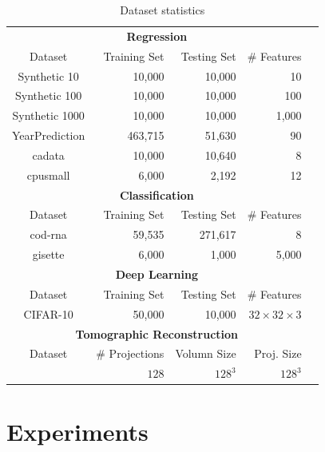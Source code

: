 \documentclass{article}
\begin{document}
\begin{table}[t]
\small
\centering
\begin{tabular}{crrrr}
\hline
\multicolumn{4}{c}{\bf Regression}\\
Dataset           & Training Set & Testing Set & \# Features  \\
\hline
Synthetic 10   & 10,000        & 10,000       & 10               \\
Synthetic 100  & 10,000        & 10,000       & 100              \\
Synthetic 1000 & 10,000        & 10,000       & 1,000           \\
YearPrediction & 463,715       & 51,630       & 90                  \\
cadata         & 10,000        & 10,640       & 8                   \\
cpusmall       & 6,000         & 2,192        & 12     \\
\hline
\hline
\multicolumn{4}{c}{\bf Classification}\\
Dataset           & Training Set & Testing Set & \# Features \\
\hline
cod-rna        & 59,535        & 271,617      & 8    \\
gisette        & 6,000         & 1,000        & 5,000  \\  
\hline
\hline
\multicolumn{4}{c}{\bf Deep Learning}\\
Dataset           & Training Set & Testing Set & \# Features \\
\hline
CIFAR-10        & 50,000        & 10,000      &$32\times 32\times 3$     \\
\hline
\hline
\multicolumn{4}{c}{\bf Tomographic Reconstruction}\\
Dataset           & \# Projections & Volumn Size & Proj. Size \\
\hline
                  & $128$            & $128^3$      & $128^3$     \\
\hline
\end{tabular}
\vspace{-1em}
\caption{Dataset statistics}
\vspace{-.5em}
\label{table:dataset}
\end{table}

\vspace{-0.5em}
\section{Experiments} \label{sec:exp}
\end{document}

